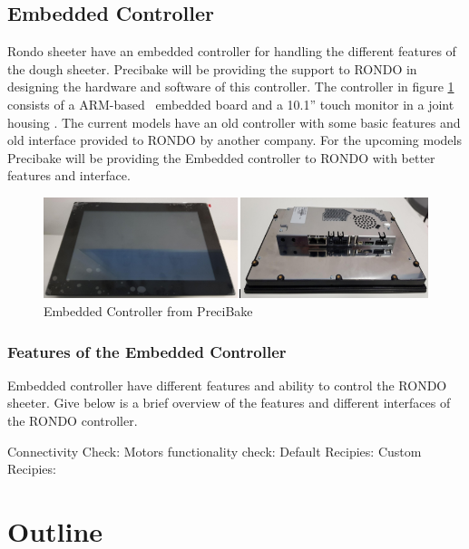 \documentclass{listhesis}
\begin{document}
\subsection{Embedded Controller}
Rondo sheeter have an embedded controller for handling the different features of the dough sheeter. Precibake will be providing the support to RONDO in designing the hardware and software of this controller. The controller in figure \ref{fig:embeddedcontroller} consists of a ARM-based~\cite{arm} embedded board and a 10.1” touch monitor in a joint housing . The current models have an old controller with some basic features and old interface provided to RONDO by another company. For the upcoming models Precibake will be providing the Embedded controller to RONDO with better features and interface. 
\begin{figure}[h!]
  \includegraphics[width=\linewidth]{embeddedcontroller.png}
  \centering
  \caption{Embedded Controller from PreciBake}
  \label{fig:embeddedcontroller}
\end{figure}

\subsubsection{Features of the Embedded Controller}
Embedded controller have different features and ability to control the RONDO sheeter. Give below is a brief overview of the features and different interfaces of the RONDO controller. 

Connectivity Check:
Motors functionality check:
Default Recipies:
Custom Recipies:



\section{Outline}
\end{document}
